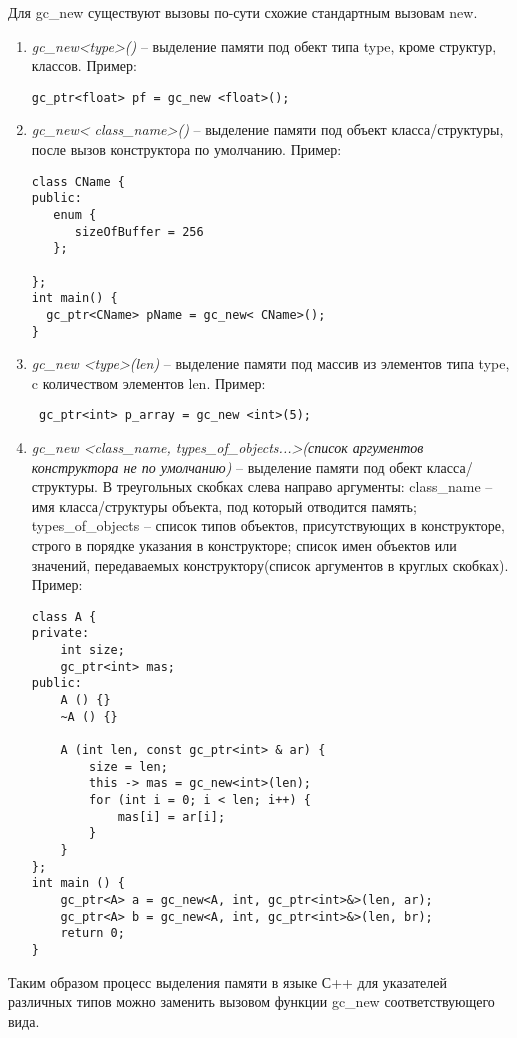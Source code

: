 Для gc\_new существуют вызовы по-сути схожие стандартным вызовам new.
\begin {enumerate}
\item \textit{gc\_new<type>()} --  выделение памяти под обект типа type, кроме структур, классов. 
Пример:
 \begin{lstlisting}
gc_ptr<float> pf = gc_new <float>();
\end{lstlisting}
\item \textit{gc\_new< class\_name>()} -- выделение памяти под объект класса/структуры, после вызов конструктора по умолчанию. 
Пример:
 \begin{lstlisting}
class CName {
public:
   enum {
      sizeOfBuffer = 256
   };

};
int main() {
  gc_ptr<CName> pName = gc_new< CName>();
}
\end{lstlisting}

\item \textit{gc\_new <type>(len)} -- выделение памяти под массив из элементов типа type, c количеством элементов len. 
Пример:
 \begin{lstlisting}
 gc_ptr<int> p_array = gc_new <int>(5);
\end{lstlisting}

\item \textit{gc\_new <class\_name, types\_of\_objects...>(список аргументов конструктора не по умолчанию)} -- выделение памяти под обект класса/структуры. В треугольных скобках слева направо аргументы: class\_name -- имя класса/структуры объекта, под который отводится память; types\_of\_objects -- список типов объектов, присутствующих в конструкторе, строго в порядке указания в конструкторе; список имен объектов или значений, передаваемых конструктору(список аргументов в круглых скобках). 
Пример:
 \begin{lstlisting}
class A {
private:
	int size;
	gc_ptr<int> mas;
public:
	A () {}
	~A () {}

	A (int len, const gc_ptr<int> & ar) {
		size = len;
		this -> mas = gc_new<int>(len);
		for (int i = 0; i < len; i++) {
			mas[i] = ar[i];
		}
	}
};
int main () {
	gc_ptr<A> a = gc_new<A, int, gc_ptr<int>&>(len, ar);
	gc_ptr<A> b = gc_new<A, int, gc_ptr<int>&>(len, br);
	return 0;
}
\end{lstlisting}
\end {enumerate}

Таким образом процесс выделения памяти в языке С++ для указателей различных типов можно заменить вызовом  функции gc\_new соответствующего вида.

